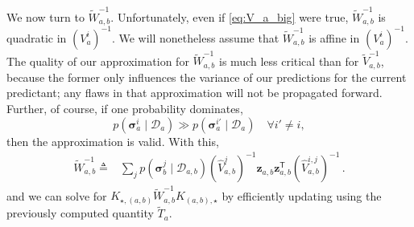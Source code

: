 \documentclass{article}
\newcommand{\given}{\ensuremath{\mid}}
\newcommand{\cm}[1]{\ensuremath{\mathcal{#1}}}
\newcommand{\bm}[1]{\ensuremath{\mathbf{#1}}}
\newcommand{\data}{\ensuremath{\cm{D}}}
\newcommand{\vect}[1]{\bm{#1}}
\newcommand{\vz}{\vect{z}}
\newcommand{\vs}{\vect{\sigma}}
\newcommand{\fPr}{p}
\newcommand{\Prob}[2]{\fPr(#1 \given #2 )}
\newcommand{\tr}{\ensuremath{\mathsf{T}}}
\newcommand{\defequal}{\triangleq}
\begin{document}
We now turn to $\tilde{W}_{a,b}^{-1}$. Unfortunately, even if
\eqref{eq:V_a_big} were true, $\tilde{W}_{a,b}^{-1}$ is quadratic in
$(V^i_a)^{-1}$. We will nonetheless assume that $\tilde{W}_{a,b}^{-1}$
is affine in $(V^i_a)^{-1}$. The quality of our approximation for
$\tilde{W}_{a,b}^{-1}$ is much less critical than for
$\tilde{V}^{-1}_{a,b}$, because the former only influences the
variance of our predictions for the current predictant; any flaws in
that approximation will not be propagated forward. Further, of course,
if one probability dominates, 
\begin{equation*}
\Prob{\vs^i_{a}}{\data_{a}}\gg
\Prob{\vs^{i'}_{a}}{\data_{a}} \quad \forall i' \neq i,
\end{equation*} 
then the approximation is valid. With this,
\begin{align}
\tilde{W}^{-1}_{a,b} \defequal
& \sum_{j} \Prob{\vs^j_{b}}{\data_{a,b}} (\hat{V}_{a,b}^{j})^{-1}\vz_{a,b}^{\phantom{\tr}} \vz_{a,b}^\tr (\hat{V}_{a,b}^{i,j})^{-1}\,.\label{eq:Wab}
\end{align}
and we can solve for
$K_{\star,(a,b)}\tilde{W}^{-1}_{a,b}K_{(a,b),\star}$ by efficiently
updating using the previously computed quantity $\tilde{T}_{a}$.
\end{document}

